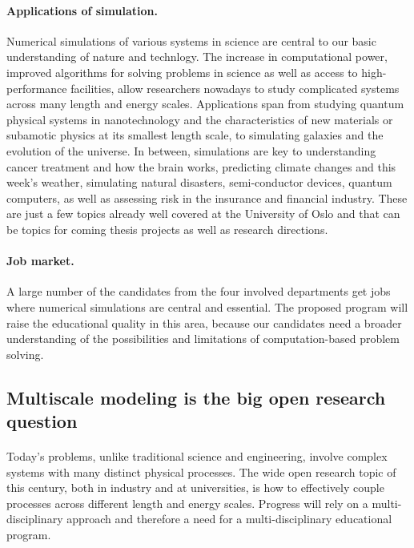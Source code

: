 \documentclass[%
oneside,                 %
final,                   %
10pt]{article}
\begin{document}
\paragraph{Applications of simulation.}
Numerical simulations of various systems in science are central to our
basic understanding of nature and technlogy.
The increase in computational power,
improved algorithms for solving problems in science as well as access
to high-performance facilities, allow researchers nowadays to study
complicated systems across many length and energy scales. Applications
span from studying quantum physical systems in nanotechnology and the
characteristics of new materials or subamotic physics at its smallest
length scale, to simulating galaxies and the evolution of the universe.
In between, simulations are key to understanding
cancer treatment and how the brain works,
predicting climate changes and this week's weather,
simulating natural disasters, semi-conductor devices,
quantum computers, as well as assessing risk in the insurance and
financial industry. These are just a few topics
already well covered at the University of Oslo and that can be
topics for coming thesis projects as well as research directions.




\paragraph{Job market.}
A large number of the candidates from the four involved departments
get jobs where numerical simulations are central and essential. The proposed
program will raise the educational quality in this area, because
our candidates need a broader understanding of the possibilities
and limitations of computation-based problem solving.



\subsection*{Multiscale modeling is the big open research question}


\paragraph{}
Today's problems, unlike traditional
science and engineering, involve complex systems with many distinct
physical processes. The wide open research topic of this century, both
in industry and at universities, is how to effectively couple
processes across different length and energy scales. Progress will
rely on a multi-disciplinary approach and therefore a need for
a multi-disciplinary educational program.
\end{document}
